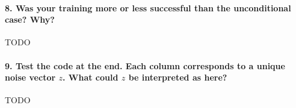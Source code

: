 
\paragraph*{8. Was your training more or less successful than the unconditional case? Why?}

TODO

\paragraph*{9. Test the code at the end. Each column corresponds to a unique noise vector $z$. What could $z$ be interpreted as here?}

TODO
